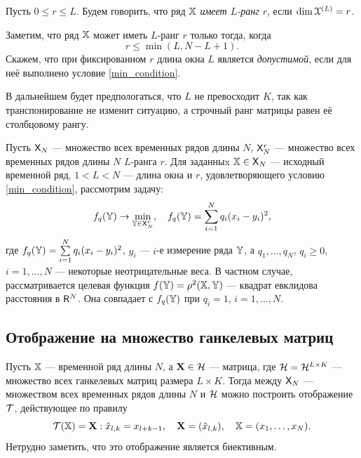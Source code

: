 \documentclass[12pt,a4paper,fleqn,leqno]{article}
\begin{document}
\begin{definition}
Пусть $0 \le r \le L$. Будем говорить, что ряд $\mathbb{X}$ \emph{имеет $L$-ранг $r$}, если $\dim \EuScript{X}^{(L)} = r$.
\end{definition}

Заметим, что ряд $\mathbb{X}$ может иметь $L$-ранг $r$ только тогда, когда
\begin{equation}
r \le \min(L, N-L+1). \label{min_condition}
\end{equation}
Скажем, что при фиксированном $r$ длина окна $L$ является \emph{допустимой}, если для неё выполнено условие \eqref{min_condition}.

В дальнейшем будет предпологаться, что $L$ не превосходит $K$, так как транспонирование не изменит ситуацию, а строчный ранг матрицы равен её столбцовому рангу.

Пусть $\mathsf{X}_N$ --- множество всех временных рядов длины $N$, $\mathsf{X}_N^r$ --- множество всех временных рядов длины $N$ $L$-ранга $r$. Для заданныx $\mathbb{X} \in \mathsf{X}_N$ --- исходный временной ряд, $1 < L < N$ --- длина окна и $r$, удовлетворяющего условию \eqref{min_condition}, рассмотрим задачу:
\begin{equation} \label{L-rank_task}
f_q(\mathbb{Y}) \to \min_{\mathbb{Y} \in \mathsf{X}_N^r}, \quad f_q(\mathbb{Y}) = \sum \limits_{i=1}^N q_i(x_i - y_i)^2,
\end{equation}
где $f_q(\mathbb{Y}) = \sum \limits_{i=1}^N q_i(x_i - y_i)^2$, $y_i$ --- $i$-е измерение ряда $\mathbb{Y}$, а $q_1, \ldots, q_N$, $q_i \ge 0$, $i = 1, \ldots, N$ --- некоторые неотрицательные веса. В частном случае, рассматривается целевая функция $f(\mathbb{Y}) = \rho^2(\mathbb{X}, \mathbb{Y})$ --- квадрат евклидова расстояния в $\mathsf{R}^N$. Она совпадает с $f_q(\mathbb{Y})$ при $q_i = 1$, $i = 1, \ldots, N$.

\subsection{Отображение на множество ганкелевых матриц}
Пусть $\mathbb{X}$ --- временной ряд длины $N$, а $\mathbf{X} \in \mathcal{H}$ --- матрица, где $\mathcal{H} = \mathcal{H}^{L \times K}$ --- множество всех ганкелевых матриц размера $L \times K$. Тогда между $\mathsf{X}_N$ --- множеством всех временных рядов длины $N$ и $\mathcal{H}$ можно построить отображение $\mathcal{T}$, действующее по правилу
\begin{equation*}
\mathcal{T}(\mathbb{X}) = \mathbf{X}: \hat x_{l, k} = x_{l + k - 1}, \quad \mathbf{X} = (\hat x_{l,k}), \quad \mathbb{X} = (x_1, \ldots, x_N).
\end{equation*}
Нетрудно заметить, что это отображение является биективным.
\end{document}
